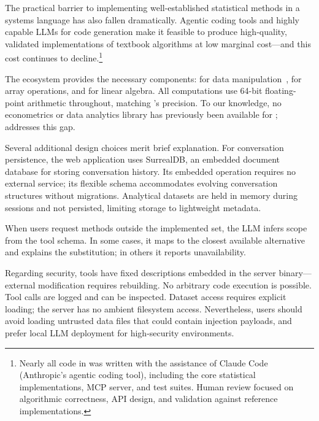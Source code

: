 The practical barrier to implementing well-established statistical
methods in a systems language has also fallen dramatically.  Agentic
coding tools and highly capable LLMs for code generation make it
feasible to produce high-quality, validated implementations of
textbook algorithms at low marginal cost---and this cost continues to
decline.\footnote{Nearly all  code in
 was written with the assistance of Claude Code
(Anthropic's agentic coding tool), including the core statistical
implementations, MCP server, and test suites.  Human review focused on
algorithmic correctness, API design, and validation against reference
implementations.}

The ecosystem provides the necessary components:  for
data manipulation~\citep{polars},  for array operations,
and  for linear algebra. All computations use 64-bit
floating-point arithmetic throughout, matching 's precision. To
our knowledge, no econometrics or data analytics library has previously been available for ;
 addresses this gap.

Several additional design choices merit brief explanation. For
conversation persistence, the web application uses SurrealDB, an
embedded document database for storing conversation history. Its
embedded operation requires no external service; its flexible schema
accommodates evolving conversation structures without migrations.
Analytical datasets are held in memory during sessions and not
persisted, limiting storage to lightweight metadata.

When users request methods outside the implemented set, the LLM
infers scope from the tool schema. In some cases, it maps to the
closest available alternative and explains the substitution; in
others it reports unavailability.

Regarding security, tools have fixed descriptions embedded in the
server binary---external modification requires rebuilding. No
arbitrary code execution is possible. Tool calls are logged and can be
inspected. Dataset access requires explicit loading; the server
has no ambient filesystem access. Nevertheless, users should avoid
loading untrusted data files that could contain injection payloads,
and prefer local LLM deployment for high-security environments.
